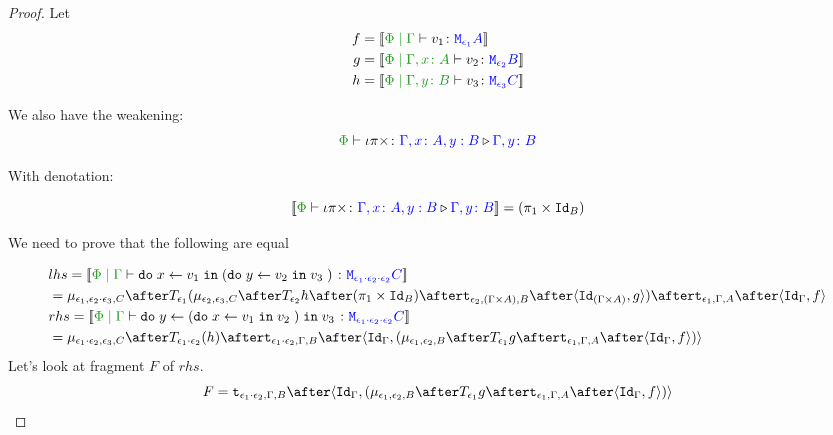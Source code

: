 \documentclass{report}
\begin{document}
\begin{framed}
\begin{proof}
        
        
        Let
        \begin{align*}
            f ={}& \deno{\gpetyperelation{v_1}{\M{\e_1}{A}}}\\
            g ={}& \deno{\etyperelation{\P}{\gax}{v_2}{\M{\e_2}{B}}}\\
            h ={}& \deno{\etyperelation{\P}{\gby}{v_3}{\M{\e_3}{C}}}\\
        \end{align*}
        
        We also have the weakening:
        \begin{equation}
            \ewrel{\P}{\i\pi\times}{\gax, y: B}{\gby}
        \end{equation}
        
        With denotation:
        
        \begin{equation}
            \deno{\ewrel{\P}{\i\pi\times}{\gax, y: B}{\gby}} = (\p \times \Id{B})
        \end{equation}
        
        We need to prove that the following are equal
        
        \begin{align*}
            &lhs =  \deno{\gpetyperelation{\doin{x}{v_1}{(\doin{y}{v_2}{v_3})}}{\M{\e_1\dot\e_2\dot\e_2}{C}}} \\
            & = \bind{\e_1}{\e_2\dot\e_3}{C}\after\T{
                \e_1}{(\bind{\e_2}{\e_3}{C}\after\T{\e_2}{h\after(\p \times \Id{B})}\after\tstrength{\e_2}{(\G\times A)}{B}\after\pr{\Id{(\G\times A)}}{g}
                )}\after\tstrength{\e_1}{\G}{A}\after\pr{\idg}{f}\\
            & rhs = \deno{\gpetyperelation{\doin{y}{(\doin{x}{v_1}{v_2})}{v_3}}{\M{\e_1\dot\e_2\dot\e_2}{C}}}  \\
            & = \bind{\e_1\dot\e_2}{\e_3}{C}\after\T{\e_1\dot\e_2}{(h)}\after\tstrength{\e_1\dot\e_2}{\G}{B}\after\pr{\idg}{(\bind{\e_1}{\e_2}{B}\after\T{\e_1}{g}\after\tstrength{\e_1}{\G}{A}\after\pr{\idg}{f})} \\
        \end{align*}
        Let's look at fragment $F$ of $rhs$.
        \begin{equation}
            F = \tstrength{\e_1\dot\e_2}{\G}{B}\after\pr{\idg}{(\bind{\e_1}{\e_2}{B}\after\T{\e_1}{g}\after\tstrength{\e_1}{\G}{A}\after\pr{\idg}{f})}
        \end{equation}
        

\end{proof}
\end{framed}
\end{document}
